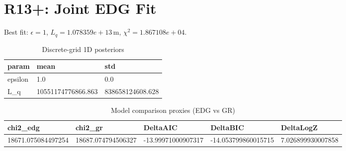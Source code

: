 \section{R13+: Joint EDG Fit}
Best fit: $\epsilon = 1$, $L_q = 1.078359e+13\,\mathrm{m}$, $\chi^2 = 1.867108e+04$.
\begin{table}[h!]
\centering
\caption{Discrete-grid 1D posteriors}
\label{tab:r13p_marg}
\begin{tabular}{l | l | l}
\hline
param & mean & std \\
\hline
epsilon & 1.0 & 0.0 \\
L_q & 10551174776866.863 & 838658124608.628 \\
\hline
\end{tabular}
\end{table}

\begin{table}[h!]
\centering
\caption{Model comparison proxies (EDG vs GR)}
\label{tab:r13p_model}
\begin{tabular}{l | l | l | l | l}
\hline
chi2_edg & chi2_gr & DeltaAIC & DeltaBIC & DeltaLogZ \\
\hline
18671.075084497254 & 18687.074794506327 & -13.99971000907317 & -14.053799860015715 & 7.026899930007858 \\
\hline
\end{tabular}
\end{table}

